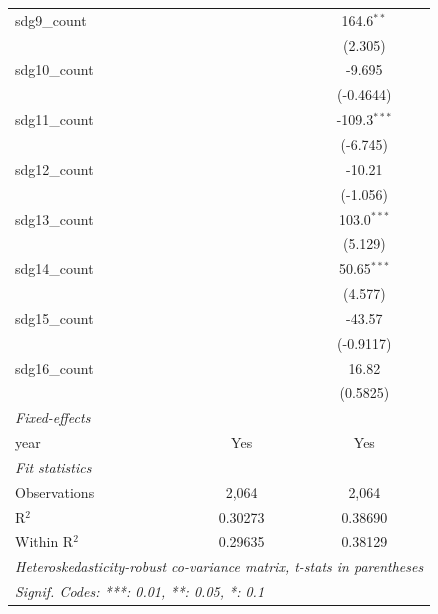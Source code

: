 \begin{tabular}{lcc}
   sdg9\_count       &                & 164.6$^{**}$\\   
                     &                & (2.305)\\   
   sdg10\_count      &                & -9.695\\   
                     &                & (-0.4644)\\   
   sdg11\_count      &                & -109.3$^{***}$\\   
                     &                & (-6.745)\\   
   sdg12\_count      &                & -10.21\\   
                     &                & (-1.056)\\   
   sdg13\_count      &                & 103.0$^{***}$\\   
                     &                & (5.129)\\   
   sdg14\_count      &                & 50.65$^{***}$\\   
                     &                & (4.577)\\   
   sdg15\_count      &                & -43.57\\   
                     &                & (-0.9117)\\   
   sdg16\_count      &                & 16.82\\   
                     &                & (0.5825)\\   
   \midrule
   \emph{Fixed-effects}\\
   year              & Yes            & Yes\\  
   \midrule
   \emph{Fit statistics}\\
   Observations      & 2,064          & 2,064\\  
   R$^2$             & 0.30273        & 0.38690\\  
   Within R$^2$      & 0.29635        & 0.38129\\  
   \midrule \midrule
   \multicolumn{3}{l}{\emph{Heteroskedasticity-robust co-variance matrix, t-stats in parentheses}}\\
   \multicolumn{3}{l}{\emph{Signif. Codes: ***: 0.01, **: 0.05, *: 0.1}}\\
\end{tabular}
\par\endgroup



